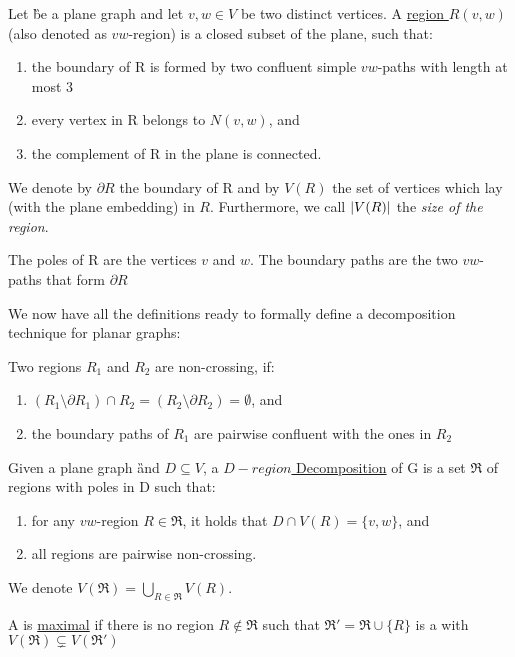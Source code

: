 
\begin{definition}
    Let \G be a plane graph and let $v,w \in V$ be two distinct vertices. A \underline{ region $R(v,w)$} (also denoted as $vw$-region) is a closed subset of the plane, such that:
    \begin{enumerate}
        \item the boundary of R is formed by two confluent simple $vw$-paths with length at most 3
        \item every vertex in R belongs to $N(v,w)$, and
        \item the complement of R in the plane is connected.
    \end{enumerate}
    
    We denote by $\partial R$ the boundary of R and by $V(R)$ the set of vertices which lay (with the plane embedding) in $R$. Furthermore, we call $\abs{V(R)}$ the \textit{size of the region}.
    
    The poles of R are the vertices $v$ and $w$. The boundary paths are the two $vw$-paths that form $\partial R$
    
\end{definition}


We now have all the definitions ready to formally define a decomposition technique for planar graphs:

\begin{definition}
    Two regions $R_1$ and $R_2$ are non-crossing, if:
    \begin{enumerate}
        \item $(R_1 \setminus \partial R_1) \cap R_2 = (R_2 \setminus \partial R_2) = \emptyset$, and
        \item the boundary paths of $R_1$ are pairwise confluent with the ones in $R_2$
    \end{enumerate}
\end{definition}

\begin{definition}
    Given a plane graph \G and $D\subseteq V$, a \underline{$D-region$ Decomposition} of G is a set $\mathfrak{R}$ of regions with poles in D such that: 
    \begin{enumerate}
        \item for any $vw$-region $R \in \mathfrak{R} $, it holds that $D \cap V(R) = \{v, w\}$, and
        \item all regions are pairwise non-crossing.
    \end{enumerate}
    We denote $V(\mathfrak{R}) = \bigcup\limits_{R \in \mathfrak{R}} V(R)$. 
    
    \noindent A \dreg is \underline{maximal} if there is no region $R \notin \mathfrak{R}$ such that $\mathfrak{R}' = \mathfrak{R} \cup \{R\}$ is a \dreg with $V(\mathfrak{R}) \subsetneq V(\mathfrak{R}')$
\end{definition}


